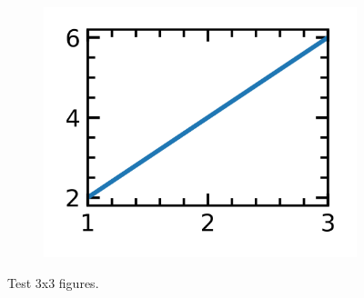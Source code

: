 \documentclass[12pt,a4paper,twoside]{article}
\numberwithin{equation}{section}
\renewcommand{\_}{\textscale{.7}{\textunderscore}}
\begin{document}
\begin{figure}[H]
\begin{subfigure}{0.31\linewidth}
		\includegraphics[width=1.0\linewidth]{3x3.png}
	\end{subfigure}
    \caption{Test 3x3 figures.}
\end{figure} 
\end{document}

